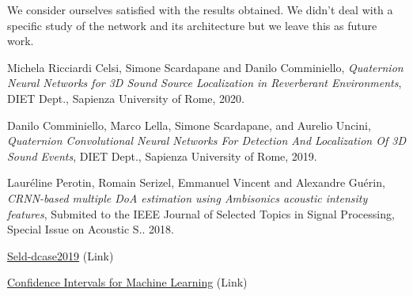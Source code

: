 \documentclass[11pt]{article}
\begin{document}
\noindent
We consider ourselves satisfied with the results obtained. We didn't deal with a specific study of the network and its architecture but we leave this as future work.


\newpage
\begin{thebibliography}{999}

  Michela Ricciardi Celsi, Simone Scardapane and Danilo Comminiello,
  \emph{Quaternion Neural Networks for 3D Sound Source
Localization in Reverberant Environments},
  DIET Dept., Sapienza University of Rome,
  2020.

  Danilo Comminiello, Marco Lella, Simone Scardapane, and Aurelio Uncini,
  \emph{Quaternion Convolutional Neural Networks
For Detection And Localization Of 3D Sound Events},
  DIET Dept., Sapienza University of Rome,
  2019.

  Lauréline Perotin, Romain Serizel, Emmanuel Vincent and Alexandre Guérin,
  \emph{CRNN-based multiple DoA estimation using Ambisonics
acoustic intensity features}, Submited to the IEEE Journal of Selected
Topics in Signal Processing, Special Issue on Acoustic S.. 2018.
  
  \href{https://github.com/sharathadavanne/seld-dcase2019}{Seld-dcase2019} (Link)
  
  \href{https://machinelearningmastery.com/confidence-intervals-for-machine-learning/}{Confidence Intervals for Machine Learning} (Link)

\end{thebibliography}
\end{document}
